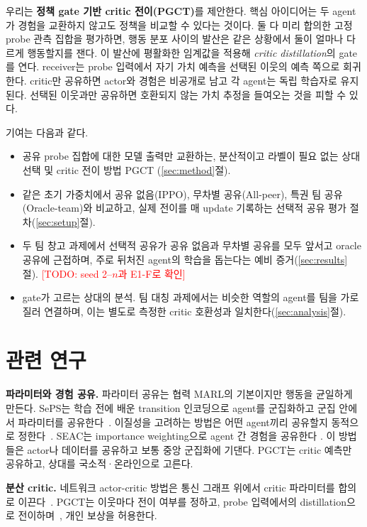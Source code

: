 \documentclass[twocolumn,10pt]{article}
\newcommand{\todo}[1]{\textcolor{red}{[TODO: #1]}}
\newcommand{\ours}{PGCT}
\begin{document}
우리는 \textbf{정책 gate 기반 critic 전이(\ours{})}를 제안한다. 핵심 아이디어는 두 agent가 경험을 교환하지 않고도 정책을
비교할 수 있다는 것이다. 둘 다 미리 합의한 고정 probe 관측 집합을 평가하면, 행동 분포 사이의 발산은 같은 상황에서 둘이 얼마나
다르게 행동할지를 잰다. 이 발산에 평활화한 임계값을 적용해 \emph{critic distillation}의 gate를 연다. receiver는 probe 입력에서
자기 가치 예측을 선택된 이웃의 예측 쪽으로 회귀한다. critic만 공유하면 actor와 경험은 비공개로 남고 각 agent는 독립 학습자로
유지된다. 선택된 이웃과만 공유하면 호환되지 않는 가치 추정을 들여오는 것을 피할 수 있다.

기여는 다음과 같다.
\begin{itemize}
  \item 공유 probe 집합에 대한 모델 출력만 교환하는, 분산적이고 라벨이 필요 없는 상대 선택 및 critic 전이 방법 \ours{}
    (\ref{sec:method}절).
  \item 같은 초기 가중치에서 공유 없음(IPPO), 무차별 공유(All-peer), 특권 팀 공유(Oracle-team)와 비교하고, 실제 전이를 매
    update 기록하는 선택적 공유 평가 절차(\ref{sec:setup}절).
  \item 두 팀 창고 과제에서 선택적 공유가 공유 없음과 무차별 공유를 모두 앞서고 oracle 공유에 근접하며, 주로 뒤처진 agent의 학습을
    돕는다는 예비 증거(\ref{sec:results}절). \todo{seed 2--$n$과 E1-F로 확인}
  \item gate가 고르는 상대의 분석. 팀 대칭 과제에서는 비슷한 역할의 agent를 팀을 가로질러 연결하며, 이는 별도로 측정한 critic
    호환성과 일치한다(\ref{sec:analysis}절).
\end{itemize}

\section{관련 연구}
\textbf{파라미터와 경험 공유.} 파라미터 공유는 협력 MARL의 기본이지만 행동을 균일하게 만든다. SePS는 학습 전에 배운 transition
인코딩으로 agent를 군집화하고 군집 안에서 파라미터를 공유한다~\cite{christianos2021seps}. 이질성을 고려하는 방법은 어떤 agent끼리
공유할지 동적으로 정한다~\cite{hu2025heterogeneity}. SEAC는 importance weighting으로 agent 간 경험을 공유한다
\cite{christianos2020seac}. 이 방법들은 actor나 데이터를 공유하고 보통 중앙 군집화에 기댄다. \ours{}는 critic 예측만 공유하고,
상대를 국소적·온라인으로 고른다.

\textbf{분산 critic.} 네트워크 actor-critic 방법은 통신 그래프 위에서 critic 파라미터를 합의로 이끈다~\cite{zhang2018networked}.
\ours{}는 이웃마다 전이 여부를 정하고, probe 입력에서의 distillation으로 전이하며~\cite{rusu2016policy}, 개인 보상을 허용한다.
\end{document}
